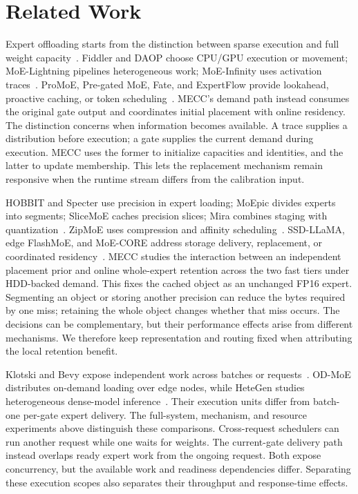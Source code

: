\documentclass[conference,9pt,letterpaper]{IEEEtran}
\begin{document}
\section{Related Work}
Expert offloading starts from the distinction between sparse execution and full weight capacity~\cite{offloading,swapmoe}. Fiddler and DAOP choose CPU/GPU execution or movement; MoE-Lightning pipelines heterogeneous work; MoE-Infinity uses activation traces~\cite{fiddler,daop,lightning,moeinfinity}. ProMoE, Pre-gated MoE, Fate, and ExpertFlow provide lookahead, proactive caching, or token scheduling~\cite{promoe,pregated,fate,expertflow}. MECC's demand path instead consumes the original gate output and coordinates initial placement with online residency. The distinction concerns when information becomes available. A trace supplies a distribution before execution; a gate supplies the current demand during execution. MECC uses the former to initialize capacities and identities, and the latter to update membership. This lets the replacement mechanism remain responsive when the runtime stream differs from the calibration input.

HOBBIT and Specter use precision in expert loading; MoEpic divides experts into segments; SliceMoE caches precision slices; Mira combines staging with quantization~\cite{hobbit,specter,moepic,slicemoe,mira}. ZipMoE uses compression and affinity scheduling~\cite{zipmoe}. SSD-LLaMA, edge FlashMoE, and MoE-CORE address storage delivery, replacement, or coordinated residency~\cite{ssdllama,flashmoe,core}. MECC studies the interaction between an independent placement prior and online whole-expert retention across the two fast tiers under HDD-backed demand. This fixes the cached object as an unchanged FP16 expert. Segmenting an object or storing another precision can reduce the bytes required by one miss; retaining the whole object changes whether that miss occurs. The decisions can be complementary, but their performance effects arise from different mechanisms. We therefore keep representation and routing fixed when attributing the local retention benefit.





Klotski and Bevy expose independent work across batches or requests~\cite{klotski,bevy}. OD-MoE distributes on-demand loading over edge nodes, while HeteGen studies heterogeneous dense-model inference~\cite{odmoe,hetegen}. Their execution units differ from batch-one per-gate expert delivery. The full-system, mechanism, and resource experiments above distinguish these comparisons. Cross-request schedulers can run another request while one waits for weights. The current-gate delivery path instead overlaps ready expert work from the ongoing request. Both expose concurrency, but the available work and readiness dependencies differ. Separating these execution scopes also separates their throughput and response-time effects.
\end{document}
